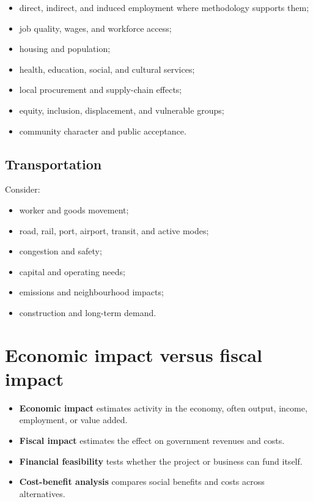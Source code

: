 \documentclass[11pt,letterpaper,oneside,openany]{book}
\begin{document}
\begin{itemize}
\item direct, indirect, and induced employment where methodology supports them;
\item job quality, wages, and workforce access;
\item housing and population;
\item health, education, social, and cultural services;
\item local procurement and supply-chain effects;
\item equity, inclusion, displacement, and vulnerable groups;
\item community character and public acceptance.
\end{itemize}


\subsection[Transportation]{Transportation}
Consider:


\begin{itemize}
\item worker and goods movement;
\item road, rail, port, airport, transit, and active modes;
\item congestion and safety;
\item capital and operating needs;
\item emissions and neighbourhood impacts;
\item construction and long-term demand.
\end{itemize}


\section[Economic impact versus fiscal impact]{Economic impact versus fiscal impact}
\begin{itemize}
\item \textbf{Economic impact} estimates activity in the economy, often output, income, employment, or value added.
\item \textbf{Fiscal impact} estimates the effect on government revenues and costs.
\item \textbf{Financial feasibility} tests whether the project or business can fund itself.
\item \textbf{Cost-benefit analysis} compares social benefits and costs across alternatives.
\end{itemize}
\end{document}
